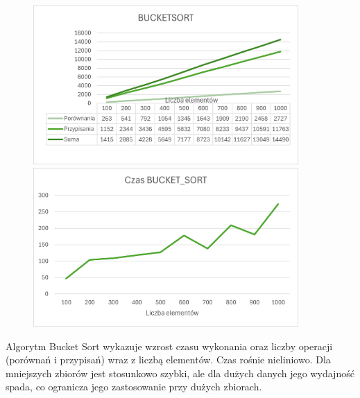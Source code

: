 \documentclass{article}
\begin{document}
			\begin{figure}[H]
				\centering
				\includegraphics[width=0.9\textwidth]{BS11.png}
				\includegraphics[width=0.9\textwidth]{BS12.png}
			\end{figure}
			
			Algorytm Bucket Sort wykazuje wzrost czasu wykonania oraz liczby operacji (porównań i przypisań) wraz z liczbą elementów. Czas rośnie nieliniowo. Dla mniejszych zbiorów jest stosunkowo szybki, ale dla dużych danych jego wydajność spada, co ogranicza jego zastosowanie przy dużych zbiorach.
			
\end{document}

